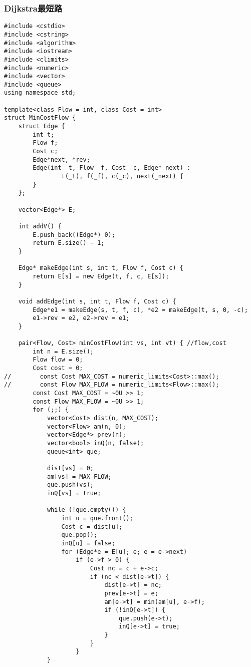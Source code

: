 \subsubsection{Dijkstra最短路}
\begin{verbatim}
#include <cstdio>
#include <cstring>
#include <algorithm>
#include <iostream>
#include <climits>
#include <numeric>
#include <vector>
#include <queue>
using namespace std;

template<class Flow = int, class Cost = int>
struct MinCostFlow {
    struct Edge {
        int t;
        Flow f;
        Cost c;
        Edge*next, *rev;
        Edge(int _t, Flow _f, Cost _c, Edge*_next) :
                t(_t), f(_f), c(_c), next(_next) {
        }
    };

    vector<Edge*> E;

    int addV() {
        E.push_back((Edge*) 0);
        return E.size() - 1;
    }

    Edge* makeEdge(int s, int t, Flow f, Cost c) {
        return E[s] = new Edge(t, f, c, E[s]);
    }

    void addEdge(int s, int t, Flow f, Cost c) {
        Edge*e1 = makeEdge(s, t, f, c), *e2 = makeEdge(t, s, 0, -c);
        e1->rev = e2, e2->rev = e1;
    }

    pair<Flow, Cost> minCostFlow(int vs, int vt) { //flow,cost
        int n = E.size();
        Flow flow = 0;
        Cost cost = 0;
//        const Cost MAX_COST = numeric_limits<Cost>::max();
//        const Flow MAX_FLOW = numeric_limits<Flow>::max();
        const Cost MAX_COST = ~0U >> 1;
        const Flow MAX_FLOW = ~0U >> 1;
        for (;;) {
            vector<Cost> dist(n, MAX_COST);
            vector<Flow> am(n, 0);
            vector<Edge*> prev(n);
            vector<bool> inQ(n, false);
            queue<int> que;

            dist[vs] = 0;
            am[vs] = MAX_FLOW;
            que.push(vs);
            inQ[vs] = true;

            while (!que.empty()) {
                int u = que.front();
                Cost c = dist[u];
                que.pop();
                inQ[u] = false;
                for (Edge*e = E[u]; e; e = e->next)
                    if (e->f > 0) {
                        Cost nc = c + e->c;
                        if (nc < dist[e->t]) {
                            dist[e->t] = nc;
                            prev[e->t] = e;
                            am[e->t] = min(am[u], e->f);
                            if (!inQ[e->t]) {
                                que.push(e->t);
                                inQ[e->t] = true;
                            }
                        }
                    }
            }


\end{verbatim}
